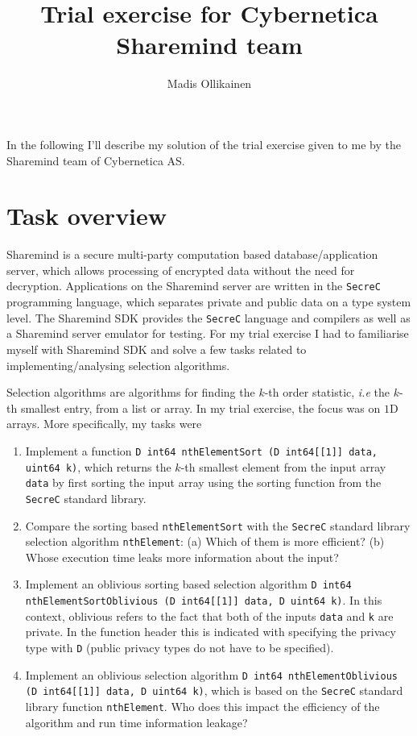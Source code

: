 \documentclass[11pt]{article}
\author{Madis Ollikainen}
\title{Trial exercise for Cybernetica Sharemind team}
\newcommand{\ct}[1]{\texttt{#1}}
\newcommand{\SC}{\ct{SecreC}\xspace}
\begin{document}
\maketitle

In the following I'll describe my solution of the trial exercise given to me by the Sharemind team of Cybernetica AS.

\section{Task overview} %
\label{sec:task_overview}

Sharemind is a secure multi-party computation based database/application server, which allows processing of encrypted data without the need for decryption. Applications on the Sharemind server are written in the \SC programming language, which separates private and public data on a type system level. The Sharemind SDK provides the \SC language and compilers as well as a Sharemind server emulator for testing. For my trial exercise I had to familiarise myself with Sharemind SDK and solve a few tasks related to implementing/analysing selection algorithms.

Selection algorithms are algorithms for finding the $k$-th order statistic, \emph{i.e} the $k$-th smallest entry, from a list or array. In my trial exercise, the focus was on $1$D arrays. More specifically, my tasks were

\begin{enumerate}
      	\item Implement a function \ct{D int64 nthElementSort (D int64[[1]] data, uint64 k)}, which returns the $k$-th smallest element from the input array \ct{data} by first sorting the input array using the sorting function from the \SC standard library.

      	\item Compare the sorting based \ct{nthElementSort} with the \SC standard library selection algorithm \ct{nthElement}: (a) Which of them is more efficient? (b) Whose execution time leaks more information about the input? 

      	\item Implement an oblivious sorting based selection algorithm \ct{D int64 nthElementSortOblivious (D int64[[1]] data, D uint64 k)}. In this context, oblivious refers to the fact that both of the inputs \ct{data} and \ct{k} are private. In the function header this is indicated with specifying the privacy type with \ct{D} (public privacy types do not have to be specified). 

      	\item Implement an oblivious selection algorithm \ct{D int64 nthElementOblivious (D int64[[1]] data, D uint64 k)}, which is based on the \SC standard library function \ct{nthElement}. Who does this impact the efficiency of the algorithm and run time information leakage? 
\end{enumerate}      
\end{document}
